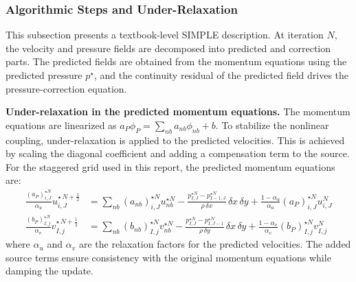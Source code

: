 \documentclass[12pt]{article}
\theoremstyle{plain}  %
\theoremstyle{definition}  %
\begin{document}
\subsubsection{Algorithmic Steps and Under-Relaxation}
\noindent This subsection presents a textbook-level SIMPLE description. At iteration $N$, the velocity and pressure fields are decomposed into predicted and correction parts. The predicted fields are obtained from the momentum equations using the predicted pressure $p^{\star}$, and the continuity residual of the predicted field drives the pressure-correction equation.

\noindent \textbf{Under-relaxation in the predicted momentum equations.} The momentum equations are linearized as $a_P \phi_P = \sum_{nb} a_{nb}\phi_{nb} + b$. To stabilize the nonlinear coupling, under-relaxation is applied to the predicted velocities. This is achieved by scaling the diagonal coefficient and adding a compensation term to the source. For the staggered grid used in this report, the predicted momentum equations are:
\begin{equation}\label{eq:simple_predicted_mom}
\begin{aligned}
\frac{(a_{P})_{i,J}^{\star N}}{\alpha_u}u_{i,J}^{\star\,N+\frac{1}{2}} &= \sum_{nb} (a_{nb})_{i,J}^{\star N}u_{nb}^{\star N}
- \frac{p_{I,J}^{\star N}-p_{I-1,J}^{\star N}}{\rho\,\delta x}\,\delta x\,\delta y
+ \frac{1-\alpha_u}{\alpha_u}(a_{P})_{i,J}^{\star N}u_{i,J}^{N} \\
\frac{(b_{P})_{I,j}^{\star N}}{\alpha_v}v_{I,j}^{\star\,N+\frac{1}{2}} &= \sum_{nb} (b_{nb})_{I,j}^{\star N}v_{nb}^{\star N}
- \frac{p_{I,J}^{\star N}-p_{I,J-1}^{\star N}}{\rho\,\delta y}\,\delta x\,\delta y
+ \frac{1-\alpha_v}{\alpha_v}(b_{P})_{I,j}^{\star N}v_{I,j}^{N}
\end{aligned}
\end{equation}
\noindent where $\alpha_u$ and $\alpha_v$ are the relaxation factors for the predicted velocities. The added source terms ensure consistency with the original momentum equations while damping the update.
\end{document}
